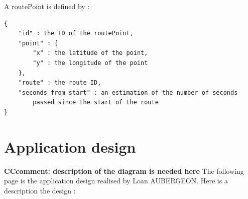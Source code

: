 A routePoint is defined by :
\begin{lstlisting}[style=DOS]
{
	"id" : the ID of the routePoint,
	"point" : {
		"x" : the latitude of the point,
		"y" : the longitude of the point
	},
	"route" : the route ID,
	"seconds_from_start" : an estimation of the number of seconds
		passed since the start of the route
}
\end{lstlisting}


\section{Application design}

{\bf CCcomment: description of the diagram is needed here}
The following page is the application design realised by Loan AUBERGEON. Here is a description the design :

